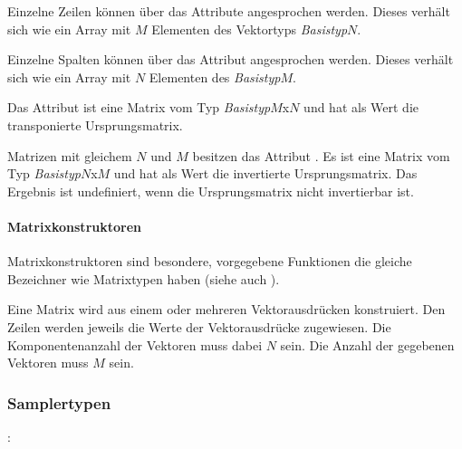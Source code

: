 Einzelne Zeilen können über das Attribute  angesprochen werden. Dieses
verhält sich wie ein Array mit $M$ Elementen des Vektortyps \emph{Basistyp}$N$.

Einzelne Spalten können über das Attribut  angesprochen werden. Dieses
verhält sich wie ein Array mit $N$ Elementen des \emph{Basistyp}$M$.

Das Attribut  ist eine Matrix vom Typ \emph{Basistyp}$M$x$N$
und hat als Wert die transponierte Ursprungsmatrix.

Matrizen mit gleichem $N$ und $M$ besitzen das Attribut .
Es ist eine Matrix vom Typ \emph{Basistyp}$N$x$M$ und hat als Wert die invertierte Ursprungsmatrix.
Das Ergebnis ist undefiniert, wenn die Ursprungsmatrix nicht invertierbar ist.

\paragraph{Matrixkonstruktoren}\label{Matrixkonstruktoren}

Matrixkonstruktoren sind besondere, vorgegebene Funktionen die gleiche Bezeichner wie Matrixtypen haben
(siehe auch ).


Eine Matrix wird aus einem oder mehreren Vektorausdrücken konstruiert. Den Zeilen werden
jeweils die Werte der Vektorausdrücke zugewiesen. Die Komponentenanzahl der Vektoren muss dabei
$N$ sein. Die Anzahl der gegebenen Vektoren muss $M$ sein.


\subsubsection{Samplertypen}\label{Samplertypen}
:\label{typ_sampler}\\
\hspace*{1cm}\glq{}\grq \\
\hspace*{1cm}\glq{}\grq \\
\hspace*{1cm}\glq{}\grq \\
\hspace*{1cm}\glq{}\grq \\

